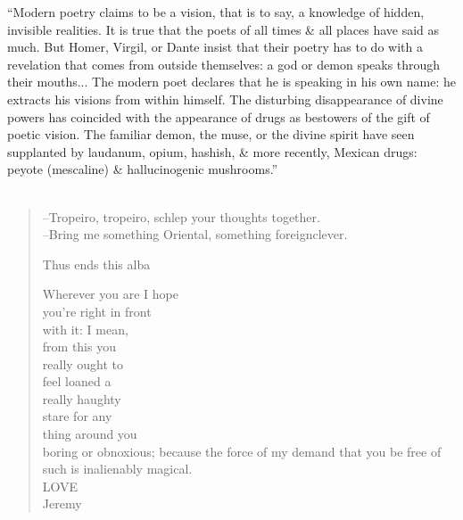 \documentclass[oneside, 11pt, twocolumn]{book}
\newcounter{secnum}
\newcommand{\secdiv}{
	\vspace{1em}
	\stepcounter{secnum}
	\thesecnum
	\vspace{1em}
}
\begin{document}
\Fontlukas

``Modern poetry claims to be a vision, that is to say, a knowledge of hidden, invisible realities. It is true that the poets of all times \& all places have said as much. But Homer, Virgil, or Dante insist that their poetry has to do with a revelation that comes from outside themselves: a god or demon speaks through their mouths... The modern poet declares that he is speaking in his own name: he extracts his visions from within himself. The disturbing disappearance of divine powers has coincided with the appearance of drugs as bestowers of the gift of poetic vision. The familiar demon, the muse, or the divine spirit have seen supplanted by laudanum, opium, hashish, \& more recently, Mexican drugs: peyote (mescaline) \& hallucinogenic mushrooms.'' \\
\\

\vspace{1em}
\begin{verse}

--Tropeiro, tropeiro, schlep your thoughts together. \\
--Bring me something Oriental, something foreignclever.



% 

% 

\secdiv

 

\newpage



\newpage





Thus ends this alba

Wherever you are I hope \\
you're right in front \\ 
with it: I mean, \\
from this you \\
really ought to \\
feel loaned a \\
really haughty \\
stare for any \\
thing around you \\
boring or obnoxious; because the force of my demand that you be free of such is inalienably magical. \\
LOVE \\
Jeremy

\end{verse}
\end{document}
